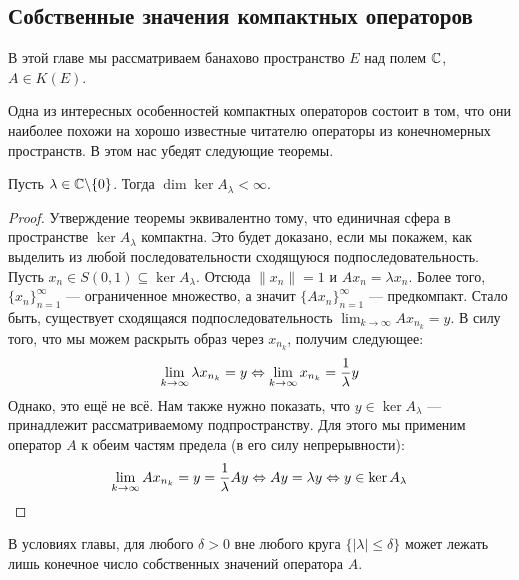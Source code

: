 \subsection*{Собственные значения компактных операторов}

\begin{note}
	В этой главе мы рассматриваем банахово пространство $E$ над полем $\mathbb{C}$, $A \in K(E)$.
\end{note}

\begin{note}
	Одна из интересных особенностей компактных операторов состоит в том, что они наиболее похожи на хорошо известные читателю операторы из конечномерных пространств. В этом нас убедят следующие теоремы.
\end{note}

\begin{theorem} \label{compact_finite_dim}
	Пусть $\lambda \in \mathbb{C} \backslash \{0\}$. Тогда $\dim \ker A_\lambda < \infty$.
\end{theorem}

\begin{proof}
	Утверждение теоремы эквивалентно тому, что единичная сфера в пространстве $\ker A_\lambda$ компактна. Это будет доказано, если мы покажем, как выделить из любой последовательности сходящуюся подпоследовательность. Пусть $x_n \in S(0, 1) \subseteq \ker A_\lambda$. Отсюда $\|x_n\| = 1$ и $Ax_n = \lambda x_n$. Более того, $\{x_n\}_{n = 1}^\infty$ --- ограниченное множество, а значит $\{Ax_n\}_{n = 1}^\infty$ --- предкомпакт. Стало быть, существует сходящаяся подпоследовательность $\lim_{k \to \infty} Ax_{n_k} = y$. В силу того, что мы можем раскрыть образ через $x_{n_k}$, получим следующее:
	\[
		\lim_{k \to \infty} \lambda x_{n_k} = y \Leftrightarrow \lim_{k \to \infty} x_{n_k} = \frac{1}{\lambda}y
	\]
	Однако, это ещё не всё. Нам также нужно показать, что $y \in \ker A_\lambda$ --- принадлежит рассматриваемому подпространству. Для этого мы применим оператор $A$ к обеим частям предела (в его силу непрерывности):
	\[
		\lim_{k \to \infty} Ax_{n_k} = y = \frac{1}{\lambda} Ay \Leftrightarrow Ay = \lambda y \Leftrightarrow y \in \ker A_\lambda
	\]
\end{proof}

\begin{theorem}
	В условиях главы, для любого $\delta > 0$ вне любого круга $\{|\lambda| \le \delta\}$ может лежать лишь конечное число собственных значений оператора $A$.
\end{theorem}

